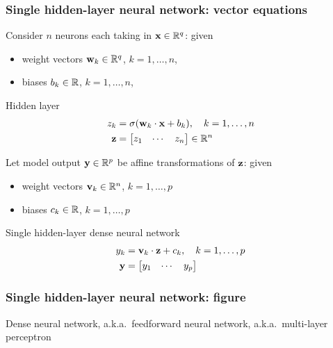 \begin{frame}
    \frametitle{Single hidden-layer neural network: vector equations}

    Consider $n$ neurons each taking in $\mathbf{x} \in \mathbb{R}^q$: given
    \begin{itemize}
        \item weight vectors $\mathbf{w}_k \in \mathbb{R}^q$, $k = 1, \ldots, n$,
        \item biases $b_k \in \mathbb{R}$, $k = 1, \ldots, n$,
    \end{itemize}
    \begin{block}{Hidden layer}
        \vspace{-1em}
        \begin{align*}
            z_k &= \sigma(\mathbf{w}_k \cdot \mathbf{x} + b_k), \quad k = 1, \ldots, n \\
            \mathbf{z} &= \begin{bmatrix} z_1 & \cdots & z_n \end{bmatrix} \in \mathbb{R}^n
        \end{align*}
    \end{block}
    \pause

    Let model output $\mathbf{y} \in \mathbb{R}^p$ be affine transformations of $\mathbf{z}$: given
    \begin{itemize}
        \item weight vectors $\mathbf{v}_k \in \mathbb{R}^n$, $k = 1, \ldots, p$
        \item biases $c_k \in \mathbb{R}$, $k = 1, \ldots, p$
    \end{itemize}
    \begin{block}{Single hidden-layer dense neural network}
        \vspace{-1em}
        \begin{align*}
            y_k &= \mathbf{v}_k \cdot \mathbf{z} + c_k, \quad k = 1, \ldots, p \\
            \mathbf{y} &= \begin{bmatrix} y_1 & \cdots & y_p \end{bmatrix}
        \end{align*}
    \end{block}
\end{frame}

\begin{frame}
    \frametitle{Single hidden-layer neural network: figure}

    {
        \centering
        
    }
    \vspace{0.5ex}

    Dense neural network, a.k.a.~feedforward neural network, a.k.a.~multi-layer perceptron
\end{frame}

